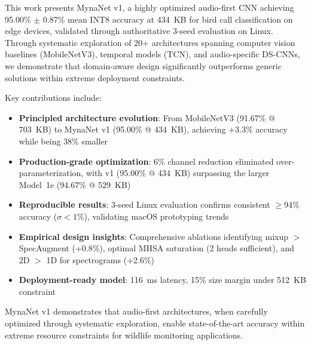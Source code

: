 \documentclass[conference]{IEEEtran}
\begin{document}
This work presents MynaNet v1, a highly optimized audio-first CNN achieving 95.00\% $\pm$ 0.87\% mean INT8 accuracy at 434~KB for bird call classification on edge devices, validated through authoritative 3-seed evaluation on Linux. Through systematic exploration of 20+ architectures spanning computer vision baselines (MobileNetV3), temporal models (TCN), and audio-specific DS-CNNs, we demonstrate that domain-aware design significantly outperforms generic solutions within extreme deployment constraints.

Key contributions include:
\begin{itemize}
    \item \textbf{Principled architecture evolution}: From MobileNetV3 (91.67\% @ 703~KB) to MynaNet v1 (95.00\% @ 434~KB), achieving +3.3\% accuracy while being 38\% smaller
    \item \textbf{Production-grade optimization}: 6\% channel reduction eliminated over-parameterization, with v1 (95.00\% @ 434~KB) surpassing the larger Model~1e (94.67\% @ 529~KB)
    \item \textbf{Reproducible results}: 3-seed Linux evaluation confirms consistent $\geq$94\% accuracy ($\sigma < 1\%$), validating macOS prototyping trends
    \item \textbf{Empirical design insights}: Comprehensive ablations identifying mixup $>$ SpecAugment (+0.8\%), optimal MHSA saturation (2 heads sufficient), and 2D $>$ 1D for spectrograms (+2.6\%)
    \item \textbf{Deployment-ready model}: 116~ms latency, 15\% size margin under 512~KB constraint
\end{itemize}

MynaNet v1 demonstrates that audio-first architectures, when carefully optimized through systematic exploration, enable state-of-the-art accuracy within extreme resource constraints for wildlife monitoring applications.



\end{document}
